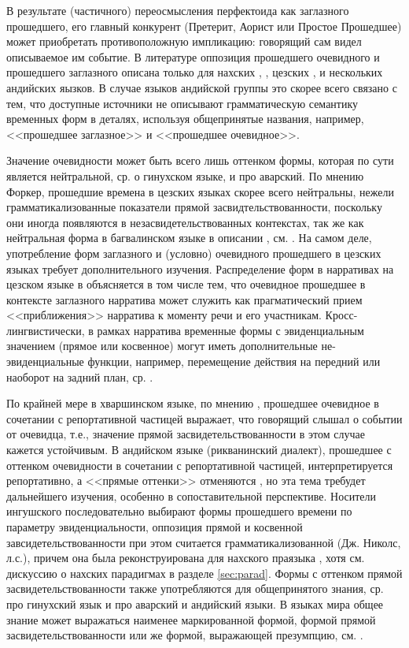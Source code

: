 В результате (частичного) переосмысления перфектоида как заглазного прошедшего, его главный конкурент (Претерит, Аорист или Простое Прошедшее) может приобретать противоположную импликацию: говорящий сам видел описываемое им событие. В литературе оппозиция прошедшего очевидного и прошедшего заглазного описана только для нахских \citep{molochieva2010}, \citep{nichols2011}, цезских \citep{comriepolinsky2007}, \citep{khalilova2011} и нескольких андийских яызков. В случае языков андийской группы это скорее всего связано с тем, что доступные источники не описывают грамматическую семантику временных форм в деталях, используя общепринятые названия, например, <<прошедшее заглазное>> и <<прошедшее очевидное>>. 
\par Значение очевидности может быть всего лишь оттенком формы, которая по сути является нейтральной, ср. \citep{forker2014} о гинухском языке, и \citep[274]{verhees2018} про аварский. По мнению Форкер, прошедшие времена в цезских языках скорее всего нейтральны, нежели грамматикализованные показатели прямой засвидтельствованности, поскольку они иногда появляются в незасвидетельствованных контекстах, так же как нейтральная форма в  багвалинском языке в описании \citep{tatevosov2007}, см. \citep[498--499]{forker2018evid}. На самом деле, употребление форм заглазного и (условно) очевидного прошедшего в цезских языках требует дополнительного изучения. Распределение форм в нарративах на цезском языке в \citep{comriepolinsky2007} объясняется в том числе тем, что очевидное прошедшее в контексте заглазного нарратива может служить как прагматический прием <<приближения>> нарратива к моменту речи и его участникам. Кросс-лингвистически, в рамках нарратива временные формы с эвиденциальным значением (прямое или косвенное) могут иметь дополнительные не-эвиденциальные функции, например, перемещение действия на передний или наоборот на задний план, ср. \citep[316--317]{aikhenvald2004}.
\par По крайней мере в хваршинском языке, по мнению \citep[43--44]{khalilova2011}, прошедшее очевидное в сочетании с репортативной частицей выражает, что говорящий слышал о событии от очевидца, т.е., значение прямой засвидетельствованности в этом случае кажется устойчивым. В андийском языке (рикванинский диалект), прошедшее с оттенком очевидности в сочетании с репортативной частицей, интерпретируется репортативно, а <<прямые оттенки>> отменяются \citep{verheesiran}, но эта тема требудет дальнейшего изучения, особенно в сопоставительной перспективе. Носители ингушского последовательно выбирают формы прошедшего времени по параметру эвиденциальности, оппозиция прямой и косвенной завсидетельствованности при этом считается грамматикализованной (Дж. Николс, л.с.), причем она была реконструирована для нахского праязыка \citep{imnaishvili1954}, хотя см. дискуссию о нахских парадигмах в разделе \ref{sec:parad}. Формы с оттенком прямой засвидетельствованности также употребляются для общепринятого знания, ср. \citep[54]{forker2014} про гинухский язык и \citep{verhees2018} про аварский и андийский языки. В языках мира общее знание может выражаться наименее маркированной формой, формой прямой засвидетельствованности или же формой, выражающей презумпцию, см. \citep{plungian2010}.

